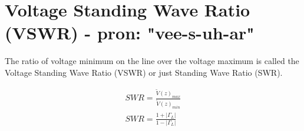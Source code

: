 \documentclass{ximera}
\begin{document}
\section{Voltage Standing Wave Ratio (VSWR) - pron: "vee-s-uh-ar"}





The ratio of voltage minimum on the line over the voltage maximum is
called the Voltage Standing Wave Ratio (VSWR) or just Standing Wave
Ratio (SWR).

\begin{eqnarray}
SWR=\frac{\tilde{V}(z)_{max}}{ \tilde{V}(z)_{min}} \nonumber \\
SWR=\frac{1+|\Gamma_L|}{1-|\Gamma_L|}
\end{eqnarray}
\end{document}
